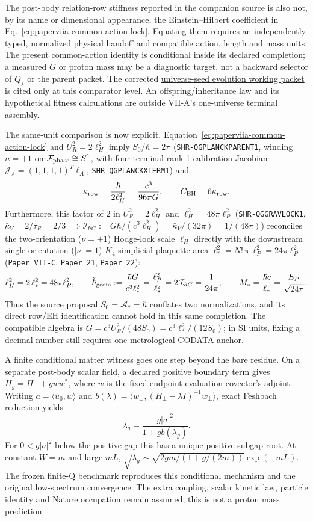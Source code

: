 \documentclass[11pt]{article}
\begin{document}
The post-body relation-row stiffness reported in the companion source is
also not, by its name or dimensional appearance, the Einstein--Hilbert
coefficient in Eq.~\eqref{eq:paperviia-common-action-lock}.  Equating them
requires an independently typed, normalized physical handoff and compatible
action, length and mass units.  The present common-action identity is
conditional inside its declared completion; a measured $G$ or proton mass
may be a diagnostic target, not a backward selector of $Q_f$ or the parent
packet.  The corrected
\href{https://github.com/jolcsak/tau-core/tree/43e475215f8fc5bf35610b0f450e582f7de148f3/theory/universe_seed_evolution}{universe-seed
evolution working packet} is cited only at this comparator level.  An
offspring/inheritance law and its hypothetical fitness calculations are
outside VII-A's one-universe terminal assembly.

The same-unit comparison is now explicit. Equation~\eqref{eq:paperviia-common-action-lock}
and $U_R^2=2\ell_H^2$ imply $S_0/\hbar=2\pi$ (\texttt{SHR-QGPLANCKPARENT1},
winding $n=+1$ on $\mathcal F_{\rm phase}\cong S^1$, with four-terminal rank-1
calibration Jacobian $\mathcal J_A=(1,1,1,1)^T\ell_A$, \texttt{SHR-QGPLANCKXTERM1}) and
\[
 \kappa_{\rm row}=\frac{\hbar}{2\ell_H^2}
 =\frac{c^3}{96\pi G},\qquad C_{\rm EH}=6\kappa_{\rm row}.
\]
Furthermore, this factor of $2$ in $U_R^2=2\ell_H^2$ and $\ell_H^2=48\pi\ell_P^2$
(\texttt{SHR-QGGRAVLOCK1}, $\bar\kappa_V=2/\tau_R=2/3\implies\mathcal I_{\hbar G}:=G\hbar/(c^3\ell_H^2)=\bar\kappa_V/(32\pi)=1/(48\pi)$)
reconciles the two-orientation ($\nu=\pm 1$) Hodge-lock scale $\ell_H$ directly
with the downstream single-orientation ($|\nu|=1$) $K_4$ simplicial plaquette area
$\ell_*^2 = N!\,\pi\,\ell_P^2 = 24\pi\ell_P^2$ (\texttt{Paper VII-C}, \texttt{Paper 21}, \texttt{Paper 22}):
\[
 \ell_H^2 = 2\,\ell_*^2 = 48\pi\ell_P^2,
 \qquad
 \tilde\hbar_{\rm geom} := \frac{\hbar G}{c^3\ell_*^2} = \frac{\ell_P^2}{\ell_*^2} = 2\,\mathcal I_{\hbar G} = \frac{1}{24\pi},
 \qquad
 M_* = \frac{\hbar c}{\ell_*} = \frac{E_P}{\sqrt{24\pi}}.
\]
Thus the source proposal $S_0=\mathcal A_*=\hbar$ conflates two normalizations,
and its direct row/EH identification cannot hold in this same completion.
The compatible algebra is $G=c^3U_R^2/(48S_0)=c^3\ell_*^2/(12S_0)$; in SI units,
fixing a decimal number still requires one metrological CODATA anchor.

A finite conditional matter witness goes one step beyond the bare residue.
On a separate post-body scalar field, a declared positive boundary term gives
$H_g=H_-+gww^*$, where $w$ is the fixed endpoint evaluation covector's adjoint.
Writing $a=\langle u_0,w\rangle$ and
$b(\lambda)=\langle w_\perp,(H_\perp-\lambda I)^{-1}w_\perp\rangle$,
exact Feshbach reduction yields
\[
 \lambda_g=\frac{g|a|^2}{1+gb(\lambda_g)}.
\]
For $0<g|a|^2$ below the positive gap this has a unique positive subgap root.
At constant $W=m$ and large $mL$,
$\sqrt{\lambda_g}\sim\sqrt{2gm/(1+g/(2m))}\exp(-mL)$.
The frozen finite-Q benchmark reproduces this conditional mechanism and the
original low-spectrum convergence. The extra coupling, scalar kinetic law,
particle identity and Nature occupation remain assumed; this is not a proton
mass prediction.
\end{document}
